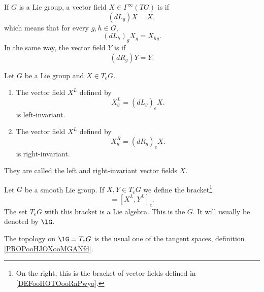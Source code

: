 \begin{definition}        \label{DEFooYHKXooVoJalX}
	If $G$ is a Lie group, a vector field $X\in\Gamma^{\infty}(TG)$ is  if
	\begin{equation}
		(dL_g) X= X,
	\end{equation}
	which means that for every \( g,h\in G\),
	\begin{equation}
		(dL_h)_gX_g=X_{hg}.
	\end{equation}
	In the same way, the vector field \( Y\) is  if
	\begin{equation}
		(dR_g)Y=Y.
	\end{equation}
\end{definition}

\begin{propositionDef}      \label{PROPooLEIAooTnnYRw}
	Let \( G\) be a Lie group and \( X\in T_eG\).
	\begin{enumerate}
		\item
		      The vector field \( X^L\) defined by
		      \begin{equation}        \label{DEFooYPUIooAzcdjP}
			      X^L_g=(dL_g)_eX.
		      \end{equation}
		      is left-invariant.
		\item
		      The vector field \( X^L\) defined by
		      \begin{equation}
			      X^R_g=(dR_g)_eX.
		      \end{equation}
		      is right-invariant.
	\end{enumerate}
	They are called the left and right-invariant vector fields  \( X\).
\end{propositionDef}

\begin{propositionDef}      \label{DEFooKDCPooZOJsMD}
	Let \( G\) be a smooth Lie group. If \( X,Y\in T_eG\) we define the bracket\footnote{On the right, this is the bracket of vector fields defined in \ref{DEFooHOTOooRaPwyo}.}
	\begin{equation}
		[X,Y] = [X^L,Y^L]_e.
	\end{equation}
	The set \( T_eG\) with this bracket is a Lie algebra. This is the  \( G\). It will usually be denoted by \( \lG\).

	The topology on \( \lG=T_eG\) is the usual one of the tangent spaces, definition \ref{PROPooHJOXooMGANfd}.
\end{propositionDef}


